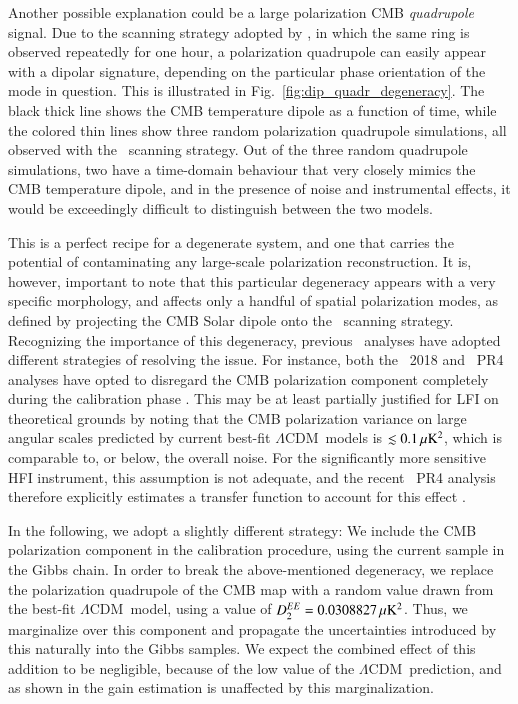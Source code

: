 \documentclass[twocolumn]{aa}
\def\LCDM{$\Lambda$CDM}
\begin{document}
Another possible explanation could be a large polarization
CMB \emph{quadrupole} signal. Due to the scanning strategy adopted by
\Planck, in which the same ring is observed repeatedly for one hour, a
polarization quadrupole can easily appear with a dipolar signature,
depending on the particular phase orientation of the mode in
question. This is illustrated in
Fig.~\ref{fig:dip_quadr_degeneracy}. The black thick line shows the
CMB temperature dipole as a function of time, while the colored thin
lines show three random polarization quadrupole simulations, all
observed with the \Planck\ scanning strategy. Out of the three random
quadrupole simulations, two have a time-domain behaviour that
very closely mimics the CMB temperature dipole, and in the presence of
noise and instrumental effects, it would be exceedingly difficult
to distinguish between the two models.

This is a perfect recipe for a degenerate system, and one
that carries the potential of contaminating any large-scale
polarization reconstruction. It is, however, important to note that
this particular degeneracy appears with a very specific morphology,
and affects only a handful of spatial polarization modes, as defined
by projecting the CMB Solar dipole onto the \Planck\ scanning
strategy. Recognizing the importance of this degeneracy, previous
\Planck\ analyses have adopted different strategies of resolving the
issue. For instance, both the \Planck\ 2018 and \Planck\ PR4 analyses
have opted to disregard the CMB polarization component completely
during the calibration phase
\citep{planck2014-a03,planck2016-l02,planck2020-LVII}. This may be at least
partially justified for LFI on theoretical grounds by noting that the
CMB polarization variance on large angular scales predicted by current
best-fit \LCDM\ models is $\lesssim0.1\muK^2$, which is comparable to,
or below, the overall noise. For the significantly more sensitive HFI
instrument, this assumption is not adequate, and the recent
\Planck\ PR4 analysis therefore explicitly estimates a transfer function to
account for this effect \citep{planck2020-LVII}.

In the following, we adopt a slightly different strategy: We include the CMB polarization component in the calibration procedure, using the current sample in the Gibbs chain. In order to break the above-mentioned degeneracy, we replace the polarization quadrupole of the CMB map with a random value drawn from the best-fit \LCDM\ model, using a value of $D_2^{EE} = 0.0308827 \muK^2$. Thus, we marginalize over this component and propagate the uncertainties introduced by this naturally into the Gibbs samples. We expect the combined effect of this addition to be negligible, because of the low value of the \LCDM\ prediction, and as shown in \cite{bp04} the gain estimation is unaffected by this marginalization.
\end{document}
